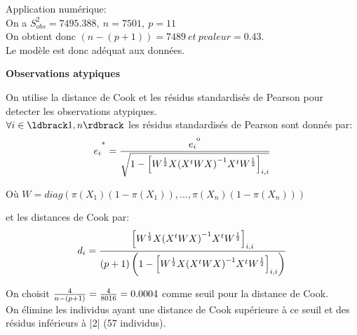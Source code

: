 \documentclass{book}
\begin{document}
\noindent
Application numérique:\\

\noindent
On a $S^2_{obs} = 7495.388,~ n = 7501,~ p = 11$\\

\noindent
On obtient donc $\left(n-\left(p+1\right)\right) = 7489 ~et~ pvaleur = 0.43$.\\

\noindent
Le modèle est donc adéquat aux données.\\

\bigskip

\noindent
\textbf{Observations atypiques}

\bigskip

\noindent
On utilise la distance de Cook et les résidus standardisés de Pearson pour detecter les observations atypiques.\\

\bigskip
\noindent
$\forall i \in \ldbrack 1,n \rdbrack$ les résidus standardisés de Pearson sont donnés par:\\
\begin{align*}
{e_i}^{\textsuperscript{*}} = { 
{{e_i}^\textsuperscript{o}} 
 \over
{\sqrt{1 - \left[ W^{1 \over 2}X {\left( X^t WX \right)}^{-1} X^t W^{1 \over 2} \right]_{i,i}   }}
        }
\end{align*}

Où $W = diag \left(
\pi\left(X_1\right) \left(1- \pi\left(X_1\right)\right)
,...,
\pi\left(X_n\right) \left(1- \pi\left(X_n\right)\right)
\right)$
\bigskip




\noindent 
et les distances de Cook par:\\
\begin{align*}
d_i = 
{{\left[W^{1 \over 2} X {\left(X^t WX \right) }^{-1} X^tW^{1 \over 2} \right]_{i,i}} 
\over 
{  \left( p+1 \right) \left( 1 - {\left[ W^{1 \over 2} X {\left(X^t WX \right) }^{-1} X^t W^{1 \over 2} \right]_{i,i}} \right)     }}
\end{align*}



\noindent
On choisit ${4 \over {n - \left( p+1 \right)} }= {4 \over 8016} = 0.0004$ comme seuil pour la distance de Cook.\\
On élimine les individus ayant une distance de Cook supérieure à ce seuil et des résidus inférieurs à |2| (57 individus).\\
\end{document}
